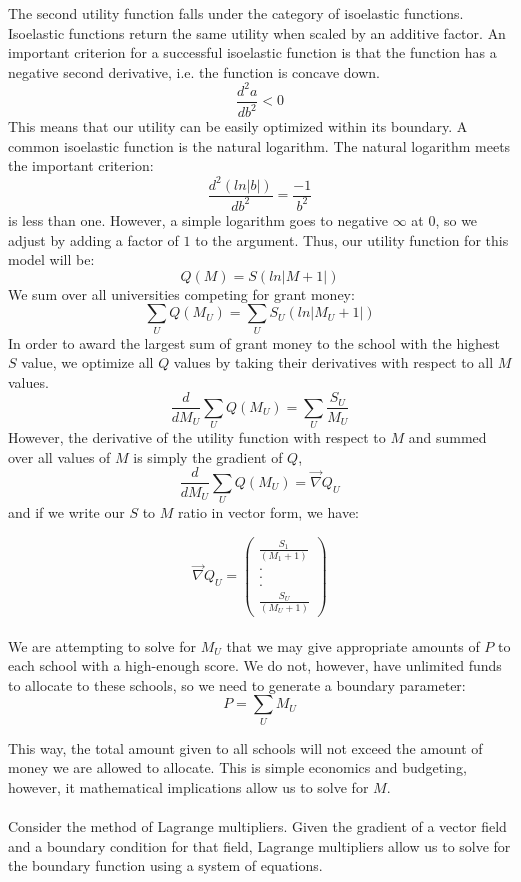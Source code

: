 \documentclass[paper.tex]{subfiles}
\begin{document}
	The second utility function falls under the category of isoelastic functions. Isoelastic functions return the same utility when scaled by an additive factor. \cite{norstad1999introduction}
	An important criterion for a successful isoelastic function is that the function has a negative second derivative, i.e. the function is concave down.  \[\frac{d^2a}{db^2} < 0\] 
	This means that our utility can be easily optimized within its boundary. A common isoelastic function is the natural logarithm. The natural logarithm meets the important criterion: \[\frac{d^2(ln|b|)}{db^2} = \frac{-1}{b^2}\]  is less than one. However, a simple logarithm goes to negative $\infty$ at $0$, so we adjust by adding a factor of $1$ to the argument. Thus, our utility function for this model will be:
	$$ Q(M) = S(ln|M+1|) $$
	We sum over all universities competing for grant money:
	$$ \sum_{U} Q(M_{U})  = \sum_{U} S_{U}(ln|M_{U}+1|)  $$
	In order to award the largest sum of grant money to the school with the highest $S$ value, we optimize all $Q$ values by taking their derivatives with respect to all $M$ values.
	$$ \frac{d}{dM_{U}} \sum_{U}Q(M_{U})  = \sum_{U}\frac{S_{U}}{M_{U}} $$
	However, the derivative of the utility function with respect to $M$ and summed over all values of $M$ is simply the gradient of $Q$,
	$$ \frac{d}{dM_{U}} \sum_{U}Q(M_{U}) = \vec{\nabla} Q_{U}   $$
	and if we write our $S$ to $M$ ratio in vector form, we have:
	 
	$$ \vec{\nabla} Q_{U} =  \left( \begin{array}{c}
	\frac{S_{1}}{(M_{1}+1)} \\
	. \\
	.\\
	.\\
	\frac{S_{U}}{(M_{U}+1)}  \end{array} \right) $$
	\\
	
	We are attempting to solve for $M_{U}$ that we may give appropriate amounts of $P$ to each school with a high-enough score. We do not, however, have unlimited funds to allocate to these schools, so we need to generate a boundary parameter:
	$$ P = \sum_{U} M_{U}   $$
	
	This way, the total amount given to all schools will not exceed the amount of money we are allowed to allocate. This is simple economics and budgeting, however, it mathematical implications allow us to solve for $M$. 
	\\\\
	Consider the method of Lagrange multipliers. Given the gradient of a vector field and a boundary condition for that field, Lagrange multipliers allow us to solve for the boundary function using a system of equations.
	
\end{document}

